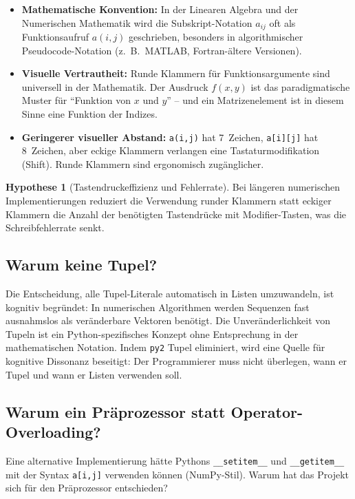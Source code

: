 \documentclass[a4paper,12pt]{article}
\theoremstyle{definition}
\newtheorem{hypothese}{Hypothese}
\begin{document}
\begin{itemize}
	\item \textbf{Mathematische Konvention:} In der Linearen Algebra und der Numerischen
	      Mathematik wird die Subskript-Notation $a_{ij}$ oft als Funktionsaufruf $a(i,j)$
	      geschrieben, besonders in algorithmischer Pseudocode-Notation (z.\ B.\ MATLAB,
	      Fortran-\"altere Versionen).
	\item \textbf{Visuelle Vertrautheit:} Runde Klammern f\"ur Funktionsargumente sind
	      universell in der Mathematik. Der Ausdruck $f(x, y)$ ist das paradigmatische
	      Muster f\"ur ``Funktion von $x$ und $y$'' -- und ein Matrizenelement ist
	      in diesem Sinne eine Funktion der Indizes.
	\item \textbf{Geringerer visueller Abstand:} \texttt{a(i,j)} hat 7~Zeichen,
	      \texttt{a[i][j]} hat 8~Zeichen, aber eckige Klammern verlangen eine
	      Tastaturmodifikation (Shift). Runde Klammern sind ergonomisch zug\"anglicher.
\end{itemize}

\begin{hypothese}[Tastendruckeffizienz und Fehlerrate]
	Bei l\"angeren numerischen Implementierungen reduziert die Verwendung runder
	Klammern statt eckiger Klammern die Anzahl der ben\"otigten Tastendr\"ucke
	mit Modifier-Tasten, was die Schreibfehlerrate senkt.
\end{hypothese}

\subsection{Warum keine Tupel?}

Die Entscheidung, alle Tupel-Literale automatisch in Listen umzuwandeln, ist kognitiv
begr\"undet: In numerischen Algorithmen werden Sequenzen fast ausnahmslos als
ver\"anderbare Vektoren ben\"otigt. Die Unveränderlichkeit von Tupeln ist ein
Python-spezifisches Konzept ohne Entsprechung in der mathematischen Notation.
Indem \texttt{py2} Tupel eliminiert, wird eine Quelle f\"ur kognitive Dissonanz
beseitigt: Der Programmierer muss nicht \"uberlegen, wann er Tupel und wann er
Listen verwenden soll.

\subsection{Warum ein Pr\"aprozessor statt Operator-Overloading?}

Eine alternative Implementierung h\"atte Pythons \texttt{\_\_setitem\_\_} und
\texttt{\_\_getitem\_\_} mit der Syntax \texttt{a[i,j]} verwenden k\"onnen
(NumPy-Stil). Warum hat das Projekt sich f\"ur den Pr\"aprozessor entschieden?
\end{document}

